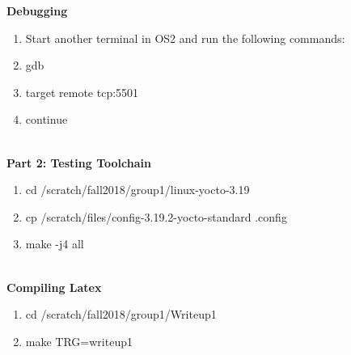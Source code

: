 \documentclass[letterpaper,10pt]{article}
\begin{document}
{\bfseries Debugging}\\
\begin{enumerate}
\item Start another terminal in OS2 and run the following commands:\\
\item gdb\\
\item target remote tcp:5501\\
\item continue\\\\
\end{enumerate}
{\bfseries Part 2: Testing Toolchain}\\
\begin{enumerate}
\item cd /scratch/fall2018/group1/linux-yocto-3.19\\
\item cp /scratch/files/config-3.19.2-yocto-standard .config\\
\item make -j4 all\\\\
\end{enumerate}
{\bfseries Compiling Latex}\\
\begin{enumerate}
\item cd /scratch/fall2018/group1/Writeup1\\
\item make TRG=writeup1\\
\end{enumerate}
\end{document}
